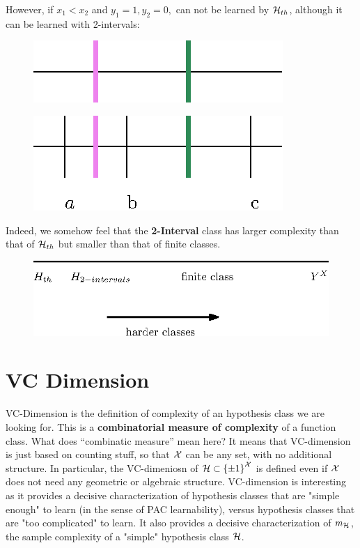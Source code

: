 However, if $x_1 < x_2$ and $y_1=1, y_2=0, $ can not be learned by $\mathcal{H}_{th}$, although it can be learned with 2-intervals:
\begin{figure}[h!]
\centering
\includegraphics[scale=0.6]{VC_threshold_intuitive2.eps}
\end{figure}

\vspace{5mm}

\begin{figure}[h!]
\centering
\includegraphics[scale=0.6]{VC_threshold_intuitive4.eps}
\end{figure}

Indeed, we somehow feel that the \textbf{2-Interval} class has larger complexity than that of $\mathcal{H}_{th}$ but smaller than that of finite classes.

\begin{figure}[h!]
\centering
\includegraphics[scale=0.8]{complexity_measure2.eps}
\end{figure}

\section{VC Dimension}

VC-Dimension is the definition of complexity of an hypothesis class we are
looking for. This is a {\bf combinatorial measure of complexity} of a function
class. What does ``combinatic measure'' mean here? It means that VC-dimension is just based on counting stuff, so that $\mathcal{X}$ can be any
set, with no additional structure. In particular, the VC-dimeniosn of
$\mathcal{H}\subset \left\{ \pm 1 \right\}^{\mathcal{X}}$ is defined even if $\mathcal{X}$ does not need any
geometric or algebraic structure. VC-dimension is interesting as it provides a
decisive characterization of hypothesis classes that are "simple enough" to
learn (in the sense of PAC learnability), versus hypothesis classes that are "too complicated" to learn. It also provides a decisive characterization of $m_{\mathcal{H}}$, the sample complexity of a "simple" hypothesis class $\mathcal{H}$.  

